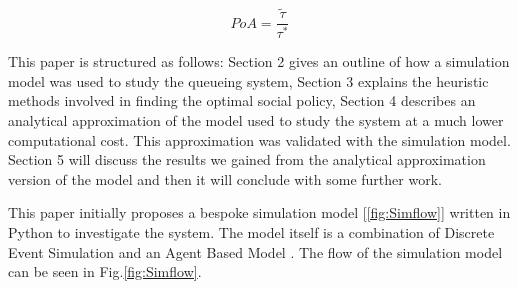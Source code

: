 \documentclass[12pt]{article}
\begin{document}
\begin{equation}\label{eq:POA}
	PoA = \frac{\text{$\tilde\tau$}}{\text{$\tau^*$}}
\end{equation}


This paper is structured as follows: Section 2 gives an outline of how a simulation model was used to study the queueing system, Section 3 explains the heuristic methods involved in finding the optimal social policy, Section 4 describes an analytical approximation of the model used to study the system at a much lower computational cost. This approximation was validated with the simulation model. Section 5 will discuss the results we gained from the analytical approximation version of the model and then it will conclude with some further work.



This paper initially proposes a bespoke simulation model [\ref{fig:Simflow}] written in Python \cite{web001} to investigate the system. The model itself is a combination of Discrete Event Simulation\cite{cite003} and an Agent Based Model \cite{cite004}. The flow of the simulation model can be seen in Fig.\ref{fig:Simflow}.
\end{document}
